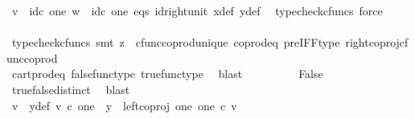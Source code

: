 \begin{isabellebody}
\ {\isacartoucheopen}v\ {\isacharequal}{\kern0pt}\ id\isactrlsub c\ one{\isacartoucheclose}\ {\isacartoucheopen}w\ {\isacharequal}{\kern0pt}\ id\isactrlsub c\ one{\isacartoucheclose}\ eqs\ id{\isacharunderscore}{\kern0pt}right{\isacharunderscore}{\kern0pt}unit{}\ x{\isacharunderscore}{\kern0pt}def\ y{\isacharunderscore}{\kern0pt}def\ \isamarkupfalse%
\ {\isacharparenleft}{\kern0pt}typecheck{\isacharunderscore}{\kern0pt}cfuncs{\isacharcomma}{\kern0pt}\ force{\isacharparenright}{\kern0pt}\isanewline
\ \ \ \ \ \ \isamarkupfalse%
\ \isamarkupfalse%
\ {\isachardoublequoteopen}{\isasymlangle}{\isasymt}{\isacharcomma}{\kern0pt}\ {\isasymt}{\isasymrangle}\ {\isacharequal}{\kern0pt}\ {\isasymlangle}{\isasymf}{\isacharcomma}{\kern0pt}{\isasymf}{\isasymrangle}{\isachardoublequoteclose}\isanewline
\ \ \ \ \ \ \ \ \isamarkupfalse%
\ {\isacharparenleft}{\kern0pt}typecheck{\isacharunderscore}{\kern0pt}cfuncs{\isacharcomma}{\kern0pt}\ smt\ {\isacharparenleft}{\kern0pt}z{}{\isacharparenright}{\kern0pt}\ \ cfunc{\isacharunderscore}{\kern0pt}coprod{\isacharunderscore}{\kern0pt}unique\ coprod{\isacharunderscore}{\kern0pt}eq{}\ pre{\isacharunderscore}{\kern0pt}IFF{\isacharunderscore}{\kern0pt}type\ right{\isacharunderscore}{\kern0pt}coproj{\isacharunderscore}{\kern0pt}cfunc{\isacharunderscore}{\kern0pt}coprod{\isacharparenright}{\kern0pt}\ \ \ \ \ \ \isanewline
\ \ \ \ \ \ \isamarkupfalse%
\ \isamarkupfalse%
\ {\isachardoublequoteopen}{\isasymt}\ {\isacharequal}{\kern0pt}\ {\isasymf}{\isachardoublequoteclose}\isanewline
\ \ \ \ \ \ \ \ \isamarkupfalse%
\ cart{\isacharunderscore}{\kern0pt}prod{\isacharunderscore}{\kern0pt}eq{}\ false{\isacharunderscore}{\kern0pt}func{\isacharunderscore}{\kern0pt}type\ true{\isacharunderscore}{\kern0pt}func{\isacharunderscore}{\kern0pt}type\ \isamarkupfalse%
\ blast\isanewline
\ \ \ \ \ \ \isamarkupfalse%
\ \isamarkupfalse%
\ False\isanewline
\ \ \ \ \ \ \ \ \isamarkupfalse%
\ true{\isacharunderscore}{\kern0pt}false{\isacharunderscore}{\kern0pt}distinct\ \isamarkupfalse%
\ blast\isanewline
\ \ \ \ \isamarkupfalse%
\isanewline
\ \ \ \ \isamarkupfalse%
\ \isamarkupfalse%
\ v\ \ y{\isacharunderscore}{\kern0pt}def{\isacharcolon}{\kern0pt}\ {\isachardoublequoteopen}v\ {\isasymin}\isactrlsub c\ one\ {\isasymand}\ y\ {\isacharequal}{\kern0pt}\ left{\isacharunderscore}{\kern0pt}coproj\ one\ one\ {\isasymcirc}\isactrlsub c\ v{\isachardoublequoteclose}\isanewline

\end{isabellebody}
